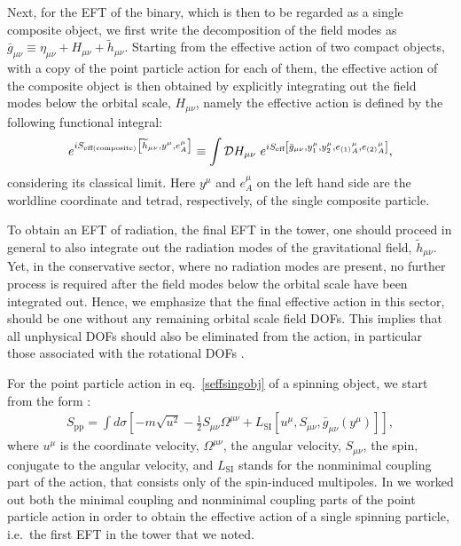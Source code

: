 \documentclass[a4paper,11pt]{article}
\newcommand{\be}{\begin{equation}}
\newcommand{\ee}{\end{equation}}
\begin{document}
Next, for the EFT of the binary, which is then to be regarded as a single composite object, 
we first write the decomposition of the field modes as
$\bar{g}_{\mu\nu}\equiv\eta_{\mu\nu}+H_{\mu\nu}+\widetilde{h}_{\mu\nu}$.
Starting from the effective action of two compact objects, with a copy of the point particle 
action for each of them, the effective action of the composite object is then
obtained by explicitly integrating out the field modes below the orbital scale, 
$H_{\mu\nu}$, namely the effective action is defined by the following functional integral:
\be \label{orbitintegrateout}
e^{iS_{\text{eff(composite)}}\left[\widetilde{h}_{\mu\nu}, y^\mu, e^{\mu}_A\right]} 
\equiv \int {\cal{D}}H_{\mu\nu}~e^{iS_{\text{eff}}\left[\bar{g}_{\mu\nu}, y^\mu_{1}, 
y^\mu_{2}, e_{(1)}{}^{\mu}_{A}, e_{(2)}{}^{\mu}_{A}\right]}, 
\ee
considering its classical limit. Here $y^\mu$ and $e^{\mu}_A$ on the left hand side are the 
worldline coordinate and tetrad, respectively, of the single composite particle.

To obtain an EFT of radiation, the final EFT in the tower, one should proceed in general to 
also integrate out the radiation modes of the gravitational field, $\widetilde{h}_{\mu\nu}$. 
Yet, in the conservative sector, where no radiation modes are present, no further process is 
required after the field modes below the orbital scale have been integrated out. Hence, we 
emphasize that the final effective action in this sector, should be one without any 
remaining orbital scale field DOFs. This implies that all unphysical DOFs should also be 
eliminated from the action, in particular those associated with the rotational DOFs 
\cite{Levi:2008nh,Levi:2014sba,Levi:2015msa}. 

For the point particle action in eq.~\eqref{seffsingobj} of a spinning object, we start from 
the form \cite{Hanson:1974qy,Bailey:1975fe,Levi:2015msa}:
\begin{align}\label{Spp}
S_{\text{pp}} = \int d \sigma \left[ -m \sqrt{u^2}
								- \frac{1}{2} S_{\mu\nu}\Omega^{\mu\nu}
                + L_{\text{SI}}\left[u^{\mu}, S_{\mu\nu}, \bar{g}_{\mu\nu}
                \left(y^\mu\right)\right]\right],
\end{align} 
where $u^\mu$ is the coordinate velocity, $\Omega^{\mu\nu}$, the angular velocity, 
$S_{\mu\nu}$, the spin, conjugate to the angular velocity, and $L_{\text{SI}}$ stands for 
the nonminimal coupling part of the action, that consists only of the spin-induced 
multipoles. In \cite{Levi:2015msa} we worked out both the minimal coupling and nonminimal 
coupling parts of the point particle action in order to obtain the effective action of a 
single spinning particle, i.e.~the first EFT in the tower that we noted. 
\end{document}
